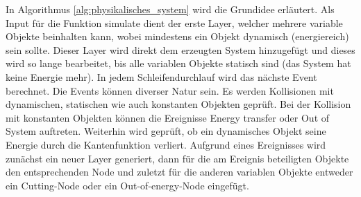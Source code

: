 In Algorithmus \ref{alg:physikalisches_system} wird die Grundidee erläutert. Als Input für die Funktion \glqq simulate\grqq{}
dient der erste Layer, welcher mehrere variable Objekte beinhalten kann, wobei mindestens ein Objekt dynamisch (energiereich)
sein sollte. Dieser Layer wird direkt dem erzeugten System hinzugefügt und dieses wird so lange bearbeitet, bis alle variablen
Objekte statisch sind (das System hat keine Energie mehr). In jedem Schleifendurchlauf wird das nächste Event berechnet.
Die Events können diverser Natur sein. Es werden Kollisionen mit dynamischen, statischen wie auch konstanten Objekten
geprüft. Bei der Kollision mit konstanten Objekten können die Ereignisse \glqq Energy transfer\grqq{} oder \glqq Out of
System\grqq{} auftreten. Weiterhin wird geprüft, ob ein dynamisches Objekt seine Energie durch die Kantenfunktion
verliert.
Aufgrund eines Ereignisses wird zunächst ein neuer Layer generiert, dann für die am Ereignis beteiligten Objekte
den entsprechenden Node und zuletzt für die anderen variablen Objekte entweder ein \glqq Cutting-Node\grqq{} oder ein
\glqq Out-of-energy-Node\grqq{} eingefügt.

